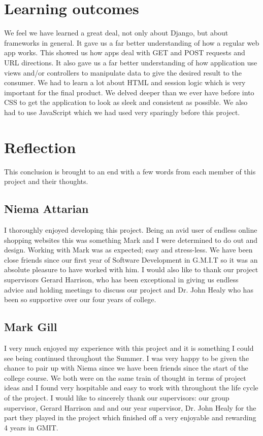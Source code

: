 \section{Learning outcomes}
We feel we have learned a great deal, not only about Django, but about frameworks in general. It gave us a far better understanding of how a regular web app works. This showed us how apps deal with GET and POST requests and URL directions. It also gave us a far better understanding of how application use views and/or controllers to manipulate data to give the desired result to the consumer. We had to learn a lot about HTML and session logic which is very important for the final product. We delved deeper than we ever have before into CSS to get the application to look as sleek and consistent as possible. We also had to use JavaScript which we had used very sparingly before this project.
\newpage
\section{Reflection}
This conclusion is brought to an end with a few words from each member of this project and their thoughts.
\subsection{Niema Attarian}
I thoroughly enjoyed developing this project. Being an avid user of endless online shopping websites this was something Mark and I were determined to do out and design. Working with Mark was as expected; easy and stress-less. We have been close friends since our first year of Software Development in G.M.I.T so it was an absolute pleasure to have worked with him. I would also like to thank our project supervisors Gerard Harrison, who has been exceptional in giving us endless advice and holding meetings to discuss our project and Dr. John Healy who has been so supportive over our four years of college.
\subsection{Mark Gill}
I very much enjoyed my experience with this project and it is something I could see being continued throughout the Summer. I was very happy to be given the chance to pair up with Niema since we have been friends since the start of the college course. We both were on the same train of thought in terms of project ideas and I found very hospitable and easy to work with throughout the life cycle of the project. I would like to sincerely thank our supervisors: our group supervisor, Gerard Harrison and and our year supervisor, Dr. John Healy for the part they played in the project which finished off a very enjoyable and rewarding 4 years in GMIT.

